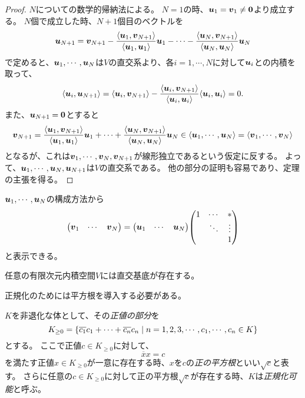 \begin{proof}
$N$についての数学的帰納法による。
$N = 1$の時、$\vb*{u}_1 = \vb*{v}_1 \ne \vb*{0}$より成立する。
$N$個で成立した時、$N+1$個目のベクトルを
$$
\vb*{u}_{N+1} = \vb*{v}_{N+1}-\frac{\langle\vb*{u}_1, \vb*{v}_{N+1}\rangle}{\langle\vb*{u}_1, \vb*{u}_1\rangle}\vb*{u}_1-\cdots-\frac{\langle\vb*{u}_N, \vb*{v}_{N+1}\rangle}{\langle\vb*{u}_N, \vb*{u}_N\rangle}\vb*{u}_N
$$
で定めると、$\vb*{u}_1, \cdots, \vb*{u}_N$は$V$の直交系より、各$i = 1, \cdots, N$に対して$\vb*{u}_i$との内積を取って、
$$
\langle\vb*{u}_i, \vb*{u}_{N+1}\rangle = \langle\vb*{u}_i, \vb*{v}_{N+1}\rangle-\frac{\langle\vb*{u}_i, \vb*{v}_{N+1}\rangle}{\langle\vb*{u}_i, \vb*{u}_i\rangle}\langle\vb*{u}_i, \vb*{u}_i\rangle = 0.
$$
また、$\vb*{u}_{N+1} = \vb*{0}$とすると
$$
\vb*{v}_{N+1}
= \frac{\langle\vb*{u}_1, \vb*{v}_{N+1}\rangle}{\langle\vb*{u}_1, \vb*{u}_1\rangle}\vb*{u}_1+\cdots+\frac{\langle\vb*{u}_N, \vb*{v}_{N+1}\rangle}{\langle\vb*{u}_N, \vb*{u}_N\rangle}\vb*{u}_N
\in \langle\vb*{u}_1, \cdots, \vb*{u}_N\rangle
= \langle\vb*{v}_1, \cdots, \vb*{v}_N\rangle
$$
となるが、これは$\vb*{v}_1, \cdots, \vb*{v}_N, \vb*{v}_{N+1}$が線形独立であるという仮定に反する。
よって、$\vb*{u}_1, \cdots, \vb*{u}_N, \vb*{u}_{N+1}$は$V$の直交系である。
他の部分の証明も容易であり、定理の主張を得る。
\end{proof}

\begin{remark}
$\vb*{u}_1, \cdots, \vb*{u}_N$の構成方法から
$$
\mqty(\vb*{v}_1 & \cdots & \vb*{v}_N)
= \mqty(\vb*{u}_1 & \cdots & \vb*{u}_N)\mqty(1 & \cdots & * \\ & \ddots & \vdots \\ & & 1)
$$
と表示できる。
\end{remark}

\begin{corollary}
任意の有限次元内積空間$V$には直交基底が存在する。
\end{corollary}

正規化のためには平方根を導入する必要がある。

\begin{definition}[正規化可能]
$K$を非退化な体として、その\emph{正値の部分}を
$$
K_{\ge 0} = \{ \overline{c_1}c_1+\cdots+\overline{c_n}c_n \mid n = 1, 2, 3, \cdots, c_1, \cdots, c_n \in K \}
$$
とする。
ここで正値$c \in K_{\ge 0}$に対して、
$$
\overline{x}x = c
$$
を満たす正値$x \in K_{\ge 0}$が一意に存在する時、$x$を$c$の\emph{正の平方根}といい$\sqrt{c}$と表す。
さらに任意の$c \in K_{\ge 0}$に対して正の平方根$\sqrt{c}$が存在する時、$K$は\emph{正規化可能}と呼ぶ。
\end{definition}

